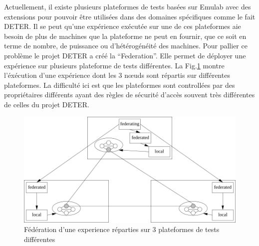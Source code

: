 Actuellement, il existe plusieurs plateformes de tests basées sur
Emulab avec des extensions pour pouvoir être utilisées dans des
domaines spécifiques comme le fait DETER. Il se peut qu'une expérience
exécutée sur une de ces plateformes aie besoin de plus de machines que
la plateforme ne peut en fournir, que ce soit en terme de nombre, de
puissance ou d'hétérogénéité des machines. Pour pallier ce problème le
projet DETER a créé la
``Federation''\citep{DETER_faber2007deter}. Elle permet de déployer
une expérience sur plusieurs plateforme de tests différentes. La
Fig.\ref{Federation} montre l'éxécution d'une expérience dont les 3
n\oe uds sont répartis sur différentes plateformes. La difficulté ici
est que les plateformes sont controllées par des propriétaires
différents ayant des règles de sécurité d'accès souvent très
différentes de celles du projet DETER.

\begin{figure}
  \centering \includegraphics[scale=0.75]{Pictures/png/Deter_federation}
  \caption{Fédération d'une experience réparties sur 3 plateformes de tests différentes}
  \label{Federation}
\end{figure}

